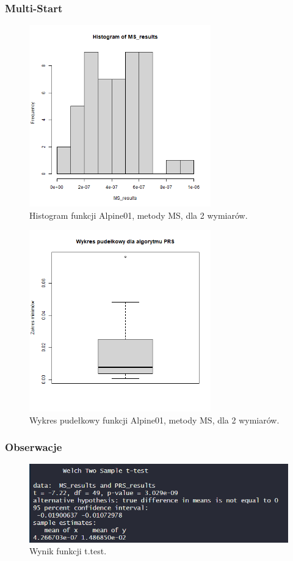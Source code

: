 \documentclass{lab}
\begin{document}
\subsubsection{Multi-Start}
\begin{figure}[H]
  \centering
  \includegraphics[width=0.7\textwidth]{img/dim2_MS_Alpine01_his.png}
  \caption{Histogram funkcji Alpine01, metody MS, dla 2 wymiarów.}
\end{figure}
\begin{figure}[H]
  \centering
  \includegraphics[width=0.7\textwidth]{img/dim2_MS_Alpine01.png}
  \caption{Wykres pudełkowy funkcji Alpine01, metody MS, dla 2 wymiarów.}
\end{figure}

\subsubsection{Obserwacje}
 \begin{figure}[H]
     \centering
     \includegraphics[width=0.9\linewidth]{img/T1.png}
     \caption{Wynik funkcji t.test.}
     \label{fig:enter-label}
 \end{figure}
\end{document}
